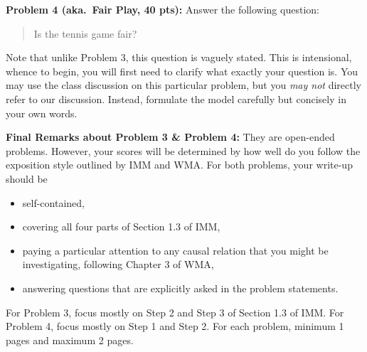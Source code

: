 \documentclass[12pt]{article}
\begin{document}
\vskip0.25in
\noindent\textbf{Problem 4 (aka.\ Fair Play, 40 pts):}
Answer the following question:
\begin{verse}
Is the tennis game fair?
\end{verse}
Note that unlike Problem 3, this question is vaguely stated.
This is intensional, whence to begin, you will first need to clarify
what exactly your question is.
You may use the class discussion on this particular 
problem, but you \emph{may not} directly refer to our 
discussion.  Instead, formulate the model carefully but concisely in 
your own words.   

\vskip0.25in
\noindent\textbf{Final Remarks about Problem 3 \& Problem 4:} 
They are open-ended problems.  However, your scores will be determined
by how well do you follow the exposition style outlined by IMM and
WMA.  For both problems, your write-up should be 
\begin{itemize}
\item self-contained,
\item covering all four parts of Section 1.3 of IMM,
\item paying a particular attention to any causal relation that you
  might be investigating, following Chapter 3 of WMA,
\item answering questions that are explicitly asked in the problem statements.
\end{itemize}
For Problem 3, focus mostly on Step 2 and Step 3 of Section
1.3 of IMM.  For Problem 4, focus mostly on Step 1 and Step
2.  For each problem, minimum 1 pages and maximum 2 pages.
\end{document}
